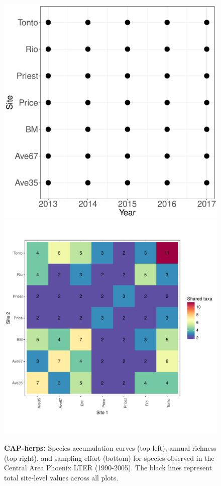 \documentclass[11pt, oneside]{article}
\begin{document}
\begin{figure}[h!]
\includegraphics[scale = 0.4]{cap-herps-banville_spatiotemporal_sampling_effort.pdf}
\includegraphics[scale = 0.4]{cap-herps-banville_spp_shared.pdf}
\caption{{\bf CAP-herps:} Species accumulation curves (top left),  annual richness (top right), and sampling effort (bottom)  for species observed in the Central Area Phoenix LTER (1990-2005). The black lines represent total site-level values across all plots.}
\label{cap-herps}
\end{figure}
\end{document}
